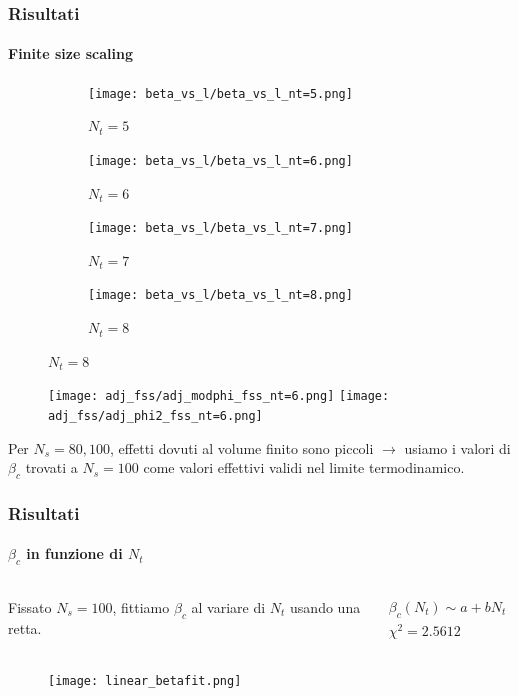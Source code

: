 \documentclass{beamer}
\begin{document}
\begin{frame}
	\frametitle{Risultati}
	\framesubtitle{Finite size scaling}
	
	\begin{figure}
		\begin{adjustwidth}{-1cm}{-0.5cm}
			\begin{subfigure}[h]{0.24\textwidth}
				\centering
				\texttt{[image: beta\_vs\_l/beta\_vs\_l\_nt=5.png]}
				\caption{$N_t = 5$}
			\end{subfigure}
			\hfill
			\begin{subfigure}[h]{0.24\textwidth}
				\centering
				\texttt{[image: beta\_vs\_l/beta\_vs\_l\_nt=6.png]}
				\caption{$N_t = 6$}
			\end{subfigure}
			\hfill
			\begin{subfigure}[h]{0.24\textwidth}
				\centering
				\texttt{[image: beta\_vs\_l/beta\_vs\_l\_nt=7.png]}
				\caption{$N_t = 7$}
			\end{subfigure}
			\hfill
			\begin{subfigure}[h]{0.24\textwidth}
				\centering
				\texttt{[image: beta\_vs\_l/beta\_vs\_l\_nt=8.png]}
				\caption{$N_t = 8$}
			\end{subfigure}
		\end{adjustwidth}
	\end{figure}

	\begin{figure}[h]
		\centering
		\texttt{[image: adj\_fss/adj\_modphi\_fss\_nt=6.png]}
		\texttt{[image: adj\_fss/adj\_phi2\_fss\_nt=6.png]}
	\end{figure}

	Per $N_s = 80, 100$, effetti dovuti al volume finito sono piccoli $\rightarrow$ \alert{usiamo i valori di $\beta_c$ trovati
	a $N_s = 100$} come valori effettivi validi nel limite termodinamico.

\end{frame}

\begin{frame}
	\frametitle{Risultati}
	\framesubtitle{$\beta_c$ in funzione di $N_t$}

	\begin{columns}
			Fissato $N_s = 100$, fittiamo $\beta_c$ al variare di $N_t$ usando una retta. 
			
			
		\begin{equation*}
			\begin{gathered}
				\beta_c(N_t) \sim a + bN_t \\
				\chi^2 = 2.5612
			\end{gathered}
		\end{equation*}
	\end{columns}

	\begin{figure}[h]
		\centering
		\texttt{[image: linear\_betafit.png]}
	\end{figure}
\end{frame}
\end{document}
